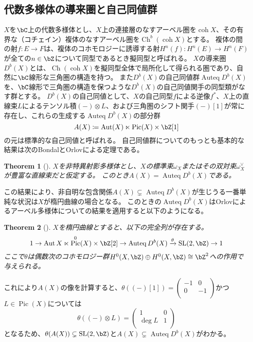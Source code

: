\documentclass[uplatex,a4paper,dvipdfmx]{jsarticle}
\theoremstyle{plain}
\newtheorem{theorem}{Theorem}[section]
\theoremstyle{definition}
\DeclareMathOperator{\Auteq}{\mathrm{Auteq}}
\DeclareMathOperator{\Pic}{\mathrm{Pic}}
\DeclareMathOperator{\Aut}{\mathrm{Aut}}
\DeclareMathOperator{\SL}{\mathrm{SL}}
\DeclareMathOperator{\Ch}{\mathrm{Ch}}
\DeclareMathOperator{\coh}{\mathrm{coh}}
\begin{document}
\subsection{代数多様体の導来圏と自己同値群}
$X$を$\bC$上の代数多様体とし、$X$上の連接層のなすアーベル圏を$\coh X$、その有界な（コチェイン）複体のなすアーベル圏を$\Ch^b(\coh X)$とする。
複体の間の射$f \colon E \to F$は、複体のコホモロジーに誘導する射$H^n(f) \colon H^n(E) \to H^n(F)$が全ての$n \in \bZ$について同型であるとき擬同型と呼ばれる。
$X$の導来圏$D^b(X)$とは、$\Ch(\coh X)$を擬同型全体で局所化して得られる圏であり、自然に$\bC$線形な三角圏の構造を持つ。
また$D^b(X)$の自己同値群$\Auteq D^b(X)$を、$\bC$線形で三角圏の構造を保つような$D^b(X)$の自己同値関手の同型類がなす群とする。
$D^b(X)$の自己同値として、$X$の自己同型$f$による逆像$f^*$、$X$上の直線束$L$によるテンソル積$(-)\otimes L$、および三角圏のシフト関手$(-)[1]$が常に存在し、これらの生成する$\Auteq D^b(X)$の部分群
\begin{equation}
	A(X) \coloneq \Aut(X) \ltimes \Pic(X) \times \bZ[1]
\end{equation}
の元は標準的な自己同値と呼ばれる。
自己同値群についてのもっとも基本的な結果は次のBondalとOrlovによる定理である。
\begin{theorem}[\cite{MR1818984}]
	$X$を非特異射影多様体とし、$X$の標準束$\omega_X$またはその双対束$\omega_X^\vee$が豊富な直線束だと仮定する。
	このとき$A(X) = \Auteq D^b(X)$である。
\end{theorem}
この結果により、非自明な包含関係$A(X) \subsetneq \Auteq D^b(X)$が生じうる一番単純な状況は$X$が楕円曲線の場合となる。
このときの$\Auteq D^b(X)$はOrlovによるアーベル多様体についての結果を適用すると以下のようになる。
\begin{theorem}[\cite{MR1921811}]
	$X$を楕円曲線とすると、以下の完全列が存在する。
	\begin{equation}\label{eq:autoequivalence_of_elliptic_curve}
		1 \to \Aut{X} \ltimes \Pic^{0}(X)\times \bZ[2] \to \Auteq{D^b(X)} \xrightarrow{\theta} \SL(2, \bZ) \to 1
	\end{equation}
	ここで$\theta$は偶数次のコホモロジー群$H^0(X, \bZ) \oplus H^0(X, \bZ) \cong \bZ^2$への作用で与えられる。
\end{theorem}
これにより$A(X)$の像を計算すると、$\theta((-)[1]) = \begin{pmatrix}
		-1 & 0  \\
		0  & -1 \\
	\end{pmatrix}$かつ$L \in \Pic(X)$については
\begin{equation}
	\theta((-) \otimes L) =
	\begin{pmatrix}
		1      & 0 \\
		\deg L & 1 \\
	\end{pmatrix}
\end{equation}
となるため、$\theta(A(X)) \subsetneq \SL(2, \bZ)$と$A(X) \subsetneq \Auteq D^b(X)$がわかる。
\end{document}
